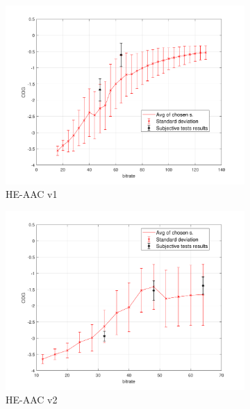 \begin{figure}[htb]\ContinuedFloat 
        \begin{subfigure}{.5\textwidth}
        \centering
        \includegraphics[width=1\linewidth]{pic/objective/heBasic.pdf}
        \caption{HE-AAC v1}
        \label{app:adv:sub3}
    \end{subfigure}%
        \begin{subfigure}{.5\textwidth}
        \centering
        \includegraphics[width=1\linewidth]{pic/objective/hev2Basic.pdf}
        \caption{HE-AAC v2}
        \label{app:bas:sub4}
    \end{subfigure}%
    \\ 
        \begin{subfigure}{.5\textwidth}

\end{subfigure}
\end{figure}
